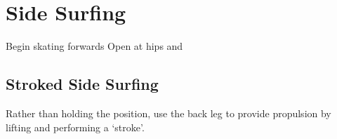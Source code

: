 \section{Side Surfing}
\label{sec:sticky/side_surf}

Begin skating forwards
Open at hips and    



\subsection*{}

\subsection*{Stroked Side Surfing}

Rather than holding the position, use the back leg to provide propulsion by lifting and performing a `stroke'.    

